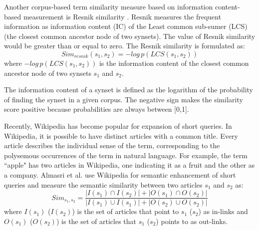 Another corpus-based term similarity measure based on information content-based measurement is Resnik similarity \cite{resnik1995using}. Resnik measures the frequent information as information content (IC) of the Least common sub-sumer (LCS) (the closest common ancestor node of two synsets). The value of Resnik similarity would be greater than or equal to zero. The Resnik similarity is formulated as:
\begin{equation}
Sim_{resnik}(s_1, s_2)= -log \,p(LCS(s_1, s_2))
\end{equation} 
where $-log \,p(LCS(s_1, s_2))$ is the information content of the closest common ancestor node of two synsets $s_1$ and $s_2$.

The information content of a synset is defined as the logarithm of the probability of finding the synset in a given corpus.
The negative sign makes the similarity score positive because probabilities are always between [0,1].

Recently, Wikipedia has become popular for expansion of short queries. In Wikipedia, it is possible to have distinct articles with a common title. Every article describes the individual sense of the term, corresponding to the polysemous occurrences of the term in natural language. For example, the term ``apple" has two articles in Wikipedia, one indicating it as a fruit and the other as a company. Almasri et al. \cite{almasri2013wikipedia} use Wikipedia for semantic enhancement of short queries and measure the semantic similarity between two articles $s_1$ and $s_2$ as:
\begin{equation}
Sim_{s_1, s_2}=\dfrac{|I(s_1)\cap I(s_2)|+|O(s_1)\cap O(s_2)|}{|I(s_1)\cup I(s_1)|+|O(s_2)\cup O(s_2)|}
\end{equation} 
where $I(s_1)$ ($I(s_2)$) is the set of articles that point to $s_1$ ($s_2$) as in-links and
\\$O(s_1)$ ($O(s_2)$) is the set of articles that $s_1$ ($s_2$) points to as out-links.

